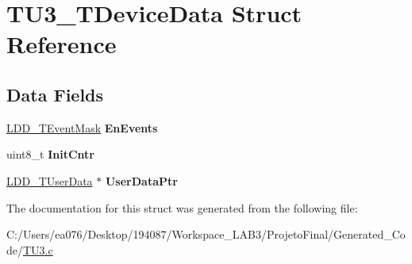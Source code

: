 \hypertarget{struct_t_u3___t_device_data}{\section{T\-U3\-\_\-\-T\-Device\-Data Struct Reference}
\label{struct_t_u3___t_device_data}
}
\subsection*{Data Fields}
\begin{DoxyCompactItemize}
\item 
\hypertarget{struct_t_u3___t_device_data_a89c5004624785071a0c377d3b4bc47dd}{\hyperlink{group___p_e___types__module_gafbe7f4d4e51560399c3bdd0218584533}{L\-D\-D\-\_\-\-T\-Event\-Mask} {\bfseries En\-Events}}\label{struct_t_u3___t_device_data_a89c5004624785071a0c377d3b4bc47dd}

\item 
\hypertarget{struct_t_u3___t_device_data_abc7999f391319d2e751e38deab5905df}{uint8\-\_\-t {\bfseries Init\-Cntr}}\label{struct_t_u3___t_device_data_abc7999f391319d2e751e38deab5905df}

\item 
\hypertarget{struct_t_u3___t_device_data_a934098f745f058adf21126ce99ccecad}{\hyperlink{group___p_e___types__module_ga0b66a73f87238a782318aa0be7578e35}{L\-D\-D\-\_\-\-T\-User\-Data} $\ast$ {\bfseries User\-Data\-Ptr}}\label{struct_t_u3___t_device_data_a934098f745f058adf21126ce99ccecad}

\end{DoxyCompactItemize}


The documentation for this struct was generated from the following file\-:\begin{DoxyCompactItemize}
\item 
C\-:/\-Users/ea076/\-Desktop/194087/\-Workspace\-\_\-\-L\-A\-B3/\-Projeto\-Final/\-Generated\-\_\-\-Code/\hyperlink{_t_u3_8c}{T\-U3.\-c}\end{DoxyCompactItemize}
